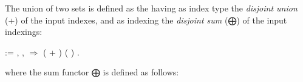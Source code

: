 \begin{example}
  The union of two sets is defined as the  having as index type the \emph{disjoint union} (+) of the input indexes, and as indexing the \emph{disjoint sum} (⨁) of the input indexings:
  \begin{coqdoccode}
    \coqdocemptyline
    \coqdocnoindent
        :=  ,  \coqdoceol
    \coqdocindent{1.00em}
      ,    \ensuremath{\Rightarrow}  ( + ) (  )\coqdoceol
    \coqdocnoindent
    .\coqdoceol
  \end{coqdoccode}

  where the sum functor ⨁ is defined as follows:


\end{example}

